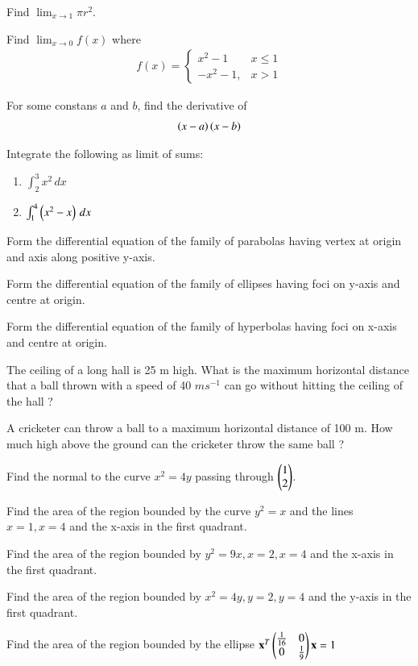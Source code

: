 %
\item Find $\lim_{x\to 1} \pi r^2$.
%
\item Find $\lim_{x\to 0} f(x)$ where
\begin{align}
f(x) = 
\begin{cases}
x^2-1 & x \le 1
\\
-x^2-1, & x > 1
\end{cases}
\end{align}
%
\item For some constans $a$ and $b$, find the derivative of
%
\begin{align}
\left(x-a\right)\left(x-b\right)
\end{align}
%
%
\item Integrate the following as limit of sums:
\begin{enumerate}[label = (\roman*)]
\item $\int_{2}^{3}x^2\, dx$
\item $\int_{1}^{4}\left(x^2-x\right)\, dx$
\end{enumerate}
\item Form the differential equation of the family of parabolas having vertex at origin and axis along positive y-axis.
\item  Form the differential equation of the family of ellipses having foci on y-axis and centre at origin.
\item  Form the differential equation of the family of hyperbolas having foci on x-axis and centre at origin.
\item The ceiling of a long hall is 25 m high. What is the maximum horizontal distance that a ball thrown with a speed of 40 $m s^{-1}$
can go without hitting the ceiling of the hall ?
\item  A cricketer can throw a ball to a maximum horizontal distance of 100 m. How much high above the ground can the cricketer throw the same ball ?
\item  Find the normal to the curve $x^2=4y$ passing through $\begin{pmatrix}1\\2\end{pmatrix}$.
%
\item Find the area of the region bounded by the curve $y^2= x$ and the lines $x = 1, x = 4$ and the x-axis in the first quadrant.
\item  Find the area of the region bounded by $y^2=9x, x=2, x=4$ and the x-axis in the  first quadrant.
%
\item Find the area of the region bounded by $x^2 = 4y, y = 2, y = 4$ and the y-axis in the first quadrant.
\item Find the area of the region bounded by the ellipse 
$
\mathbf{x}^T\begin{pmatrix}\frac{1}{16} & 0 \\ 0 & \frac{1}{9}\end{pmatrix}\mathbf{x} = 1
$

